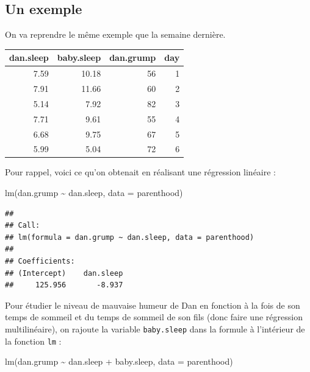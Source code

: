 \documentclass[
  french,
]{book}
\newenvironment{Shaded}{\begin{snugshade}}{\end{snugshade}}
\newcommand{\AttributeTok}[1]{\textcolor[rgb]{0.77,0.63,0.00}{#1}}
\newcommand{\FunctionTok}[1]{\textcolor[rgb]{0.00,0.00,0.00}{#1}}
\newcommand{\NormalTok}[1]{#1}
\newcommand{\SpecialCharTok}[1]{\textcolor[rgb]{0.00,0.00,0.00}{#1}}
\begin{document}
\hypertarget{un-exemple-1}{%
\subsection{Un exemple}\label{un-exemple-1}}

On va reprendre le même exemple que la semaine dernière.

\begin{tabular}{r|r|r|r}
\hline
dan.sleep & baby.sleep & dan.grump & day\\
\hline
7.59 & 10.18 & 56 & 1\\
\hline
7.91 & 11.66 & 60 & 2\\
\hline
5.14 & 7.92 & 82 & 3\\
\hline
7.71 & 9.61 & 55 & 4\\
\hline
6.68 & 9.75 & 67 & 5\\
\hline
5.99 & 5.04 & 72 & 6\\
\hline
\end{tabular}

Pour rappel, voici ce qu'on obtenait en réalisant une régression linéaire :

\begin{Shaded}
\begin{Highlighting}[]
\FunctionTok{lm}\NormalTok{(dan.grump }\SpecialCharTok{\textasciitilde{}}\NormalTok{ dan.sleep, }\AttributeTok{data =}\NormalTok{ parenthood)}
\end{Highlighting}
\end{Shaded}

\begin{verbatim}
## 
## Call:
## lm(formula = dan.grump ~ dan.sleep, data = parenthood)
## 
## Coefficients:
## (Intercept)    dan.sleep  
##     125.956       -8.937
\end{verbatim}

Pour étudier le niveau de mauvaise humeur de Dan en fonction à la fois de son temps de sommeil et du temps de sommeil de son fils (donc faire une régression multilinéaire), on rajoute la variable \texttt{baby.sleep} dans la formule à l'intérieur de la fonction \texttt{lm} :

\begin{Shaded}
\begin{Highlighting}[]
\FunctionTok{lm}\NormalTok{(dan.grump }\SpecialCharTok{\textasciitilde{}}\NormalTok{ dan.sleep }\SpecialCharTok{+}\NormalTok{ baby.sleep, }\AttributeTok{data =}\NormalTok{ parenthood)}
\end{Highlighting}
\end{Shaded}
\end{document}
